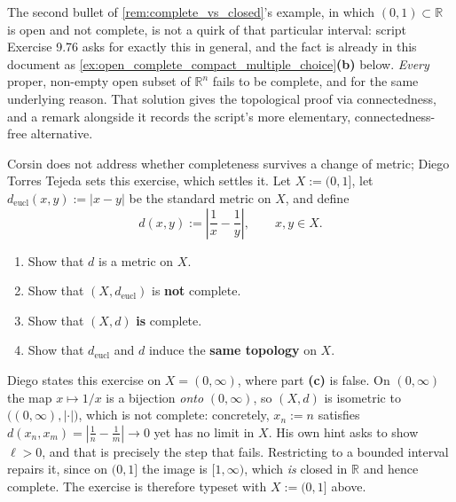 \begin{remark}
The second bullet of \cref{rem:complete_vs_closed}'s example, in which $(0,1) \subset \mathbb{R}$
is open and not complete, is not a quirk of that particular interval: script Exercise 9.76 asks
for exactly this in general, and the fact is already in this document as
\cref{ex:open_complete_compact_multiple_choice}\textbf{(b)} below. \emph{Every} proper, non-empty open subset of $\mathbb{R}^n$
fails to be complete, and for the same underlying reason. That solution gives the topological
proof via connectedness, and a remark alongside it records the script's more elementary,
connectedness-free alternative.
\end{remark}
\begin{exercise}
\label{ex:completeness_not_topological}
Corsin does not address whether completeness survives a change of metric; Diego Torres Tejeda
sets this exercise, which settles it. Let $X := (0,1]$, let $d_{\text{eucl}}(x,y) := |x-y|$ be
the standard metric on $X$, and define
\[d(x,y) := \left|\frac1x - \frac1y\right|, \qquad x,y \in X.\]
\begin{enumerate}[label=\textbf{(\alph*)}]
  \item Show that $d$ is a metric on $X$.
  \item Show that $(X,d_{\text{eucl}})$ is \textbf{not} complete.
  \item Show that $(X,d)$ \textbf{is} complete.
  \item Show that $d_{\text{eucl}}$ and $d$ induce the \textbf{same topology} on $X$.
\end{enumerate}
\end{exercise}

\begin{ainote}
Diego states this exercise on $X = (0,\infty)$, where part \textbf{(c)} is false. On
$(0,\infty)$ the map $x\mapsto1/x$ is a bijection \emph{onto} $(0,\infty)$, so $(X,d)$ is
isometric to $\big((0,\infty),|\cdot|\big)$, which is not complete: concretely, $x_n := n$
satisfies $d(x_n,x_m) = |\tfrac1n-\tfrac1m| \to 0$ yet has no limit in $X$. His own hint asks to
show $\ell > 0$, and that is precisely the step that fails. Restricting to a bounded interval
repairs it, since on $(0,1]$ the image is $[1,\infty)$, which \emph{is} closed in $\mathbb{R}$ and
hence complete. The exercise is therefore typeset with $X := (0,1]$ above.
\end{ainote}

